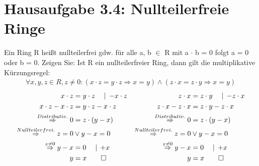 \documentclass[titlepage]{article}
\begin{document}
	\section*{Hausaufgabe 3.4: Nullteilerfreie Ringe}
		Ein Ring R heißt nullteilerfrei gdw. für alle a, b $\in$ R mit a $\cdot$ b = 0 folgt a = 0 oder b = 0. Zeigen Sie: Ist R ein nullteilerfreier Ring, dann gilt die multiplikative Kürzungsregel:
		\begin{align*}
			\forall x,y,z\in R,z\neq 0:(x\cdot z=y\cdot z\Rightarrow x=y)\wedge(z\cdot x=z\cdot y\Rightarrow x=y)
		\end{align*}
		\begin{align*}
			x\cdot z&=y\cdot z \quad\mid\,-x\cdot z &z\cdot x&= z\cdot y\quad\mid\,-z\cdot x\\
			x\cdot z-x\cdot z &= y\cdot z-x\cdot z & z\cdot x-z\cdot x&= z\cdot y-z\cdot x\\
			\overset{Distributiv.}{\Rightarrow} 0&=z\cdot(y-x) &\overset{Distributiv.}{\Rightarrow} 0&= z\cdot(y-x)\\
			\overset{Nullteilerfrei.}{\Rightarrow} z=0 &\vee y-x=0 &\overset{Nullteilerfrei.}{\Rightarrow} z=0 &\vee y-x=0\\
			\overset{z\neq0}{\Rightarrow} y-x&=0\quad\mid\,+x &\overset{z\neq0}{\Rightarrow} y-x&=0\quad\mid\,+x\\
			y&=x \qed & y&=x \qed
		\end{align*}
\end{document}
